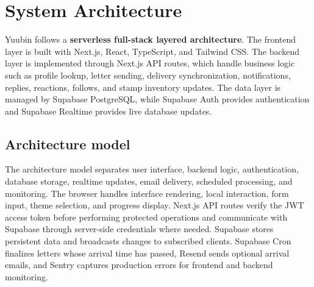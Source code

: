 ﻿\documentclass[12pt,a4paper]{report}
\begin{document}
\section{System Architecture}

Yuubin follows a \textbf{serverless full-stack layered architecture}. The frontend layer is built with Next.js, React, TypeScript, and Tailwind CSS. The backend layer is implemented through Next.js API routes, which handle business logic such as profile lookup, letter sending, delivery synchronization, notifications, replies, reactions, follows, and stamp inventory updates. The data layer is managed by Supabase PostgreSQL, while Supabase Auth provides authentication and Supabase Realtime provides live database updates.

\subsection{Architecture model}

The architecture model separates user interface, backend logic, authentication, database storage, realtime updates, email delivery, scheduled processing, and monitoring. The browser handles interface rendering, local interaction, form input, theme selection, and progress display. Next.js API routes verify the JWT access token before performing protected operations and communicate with Supabase through server-side credentials where needed. Supabase stores persistent data and broadcasts changes to subscribed clients. Supabase Cron finalizes letters whose arrival time has passed, Resend sends optional arrival emails, and Sentry captures production errors for frontend and backend monitoring.
\end{document}
